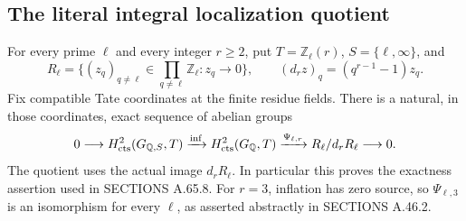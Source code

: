 \subsection{The literal integral localization quotient}
\label{sec:ghost-strict-localization}

\begin{theorem}
\label{thm:ghost-strict-localization}
For every prime \(\ell\) and every integer \(r\ge2\), put
\(T=\mathbb Z_\ell(r)\), \(S=\{\ell,\infty\}\), and
\[
 R_\ell=\{(z_q)_{q\ne\ell}\in\prod_{q\ne\ell}\mathbb Z_\ell:
                 z_q\longrightarrow0\},\qquad
 (d_rz)_q=(q^{r-1}-1)z_q.
\]
Fix compatible Tate coordinates at the finite residue fields.
There is a natural, in those coordinates, exact sequence of
abelian groups
\[
 0\longrightarrow H^2_{\rm cts}(G_{\mathbb Q,S},T)
 \xrightarrow{\rm inf}H^2_{\rm cts}(G_{\mathbb Q},T)
 \xrightarrow{\Psi_{\ell,r}}R_\ell/d_rR_\ell
 \longrightarrow0.
\]
The quotient uses the actual image \(d_rR_\ell\).
In particular this proves the exactness assertion used in
SECTIONS A.65.8. For \(r=3\), inflation has zero source,
so \(\Psi_{\ell,3}\) is an isomorphism for every \(\ell\),
as asserted abstractly in SECTIONS A.46.2.
\end{theorem}
